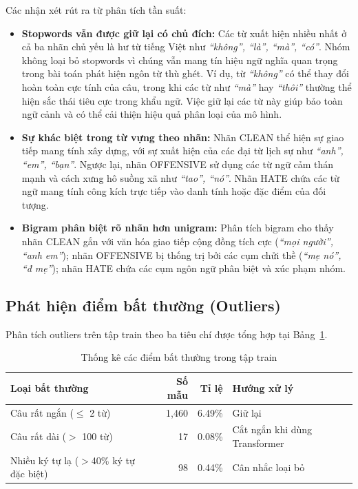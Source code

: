 Các nhận xét rút ra từ phân tích tần suất:
\begin{itemize}
    \item \textbf{Stopwords vẫn được giữ lại có chủ đích:}
          Các từ xuất hiện nhiều nhất ở cả ba nhãn chủ yếu là hư từ tiếng Việt như \textit{``không'', ``là'', ``mà'', ``có''}.
          Nhóm không loại bỏ stopwords vì chúng vẫn mang tín hiệu ngữ nghĩa quan trọng trong bài toán phát hiện ngôn từ thù ghét.
          Ví dụ, từ \textit{``không''} có thể thay đổi hoàn toàn cực tính của câu, trong khi các từ như \textit{``mà''} hay \textit{``thôi''} thường thể hiện sắc thái tiêu cực trong khẩu ngữ.
          Việc giữ lại các từ này giúp bảo toàn ngữ cảnh và có thể cải thiện hiệu quả phân loại của mô hình.
    \item \textbf{Sự khác biệt trong từ vựng theo nhãn:}
          Nhãn CLEAN thể hiện sự giao tiếp mang tính xây dựng, với sự xuất hiện của các đại từ lịch sự như \textit{``anh'', ``em'', ``bạn''}.
          Ngược lại, nhãn OFFENSIVE sử dụng các từ ngữ cảm thán mạnh và cách xưng hô suồng xã như \textit{``tao'', ``nó''}.
          Nhãn HATE chứa các từ ngữ mang tính công kích trực tiếp vào danh tính hoặc đặc điểm của đối tượng.
    \item \textbf{Bigram phân biệt rõ nhãn hơn unigram:} Phân tích bigram cho thấy nhãn CLEAN gắn với văn hóa giao tiếp cộng đồng tích cực (\textit{``mọi người'', ``anh em''}); nhãn OFFENSIVE bị thống trị bởi các cụm chửi thề (\textit{``mẹ nó'', ``đ mẹ''}); nhãn HATE chứa các cụm ngôn ngữ phân biệt và xúc phạm nhóm.
\end{itemize}

\subsection{Phát hiện điểm bất thường (Outliers)}
Phân tích outliers trên tập train theo ba tiêu chí được tổng hợp tại Bảng~\ref{tab:outliers}.

\begin{table}[H]
    \centering
    \caption{Thống kê các điểm bất thường trong tập train}
    \label{tab:outliers}
    \begin{tabular}{lrrl}
        \hline
        \textbf{Loại bất thường}                & \textbf{Số mẫu} & \textbf{Tỉ lệ} & \textbf{Hướng xử lý}          \\
        \hline
        Câu rất ngắn ($\leq$ 2 từ)              & 1,460           & 6.49\%         & Giữ lại                       \\
        Câu rất dài ($>$ 100 từ)                & 17              & 0.08\%         & Cắt ngắn khi dùng Transformer \\
        Nhiều ký tự lạ ($>$40\% ký tự đặc biệt) & 98              & 0.44\%         & Cân nhắc loại bỏ              \\
        \hline
    \end{tabular}
\end{table}

